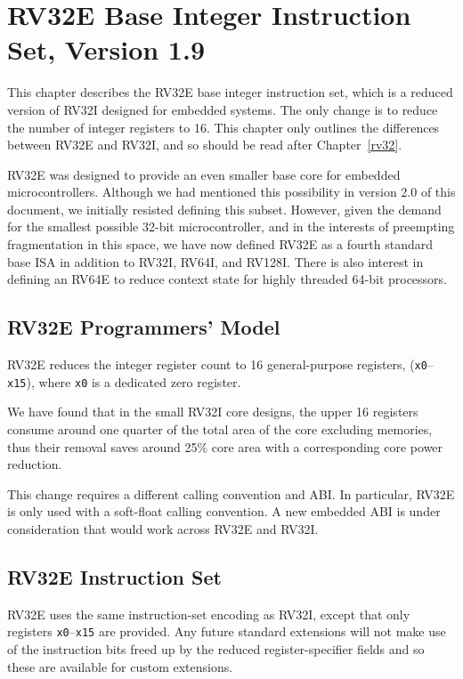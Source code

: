\chapter{RV32E Base Integer Instruction Set, Version 1.9}
\label{rv32e}

This chapter describes the RV32E base integer instruction set, which
is a reduced version of RV32I designed for embedded systems.  The only
change is to reduce the number of integer registers to 16.  This
chapter only outlines the differences between RV32E and RV32I, and so
should be read after Chapter~\ref{rv32}.

\begin{commentary}
RV32E was designed to provide an even smaller base core for embedded
microcontrollers.  Although we had mentioned this possibility in
version 2.0 of this document, we initially resisted defining this
subset. However, given the demand for the smallest possible 32-bit
microcontroller, and in the interests of preempting fragmentation in
this space, we have now defined RV32E as a fourth standard base ISA in
addition to RV32I, RV64I, and RV128I.  There is also interest in
defining an RV64E to reduce context state for highly threaded 64-bit
processors.
\end{commentary}

\section{RV32E Programmers' Model}

RV32E reduces the integer register count to 16 general-purpose
registers, ({\tt x0}--{\tt x15}), where {\tt x0} is a dedicated zero
register.

\begin{commentary}
We have found that in the small RV32I core designs, the upper 16
registers consume around one quarter of the total area of the core
excluding memories, thus their removal saves around 25\% core area
with a corresponding core power reduction.
\end{commentary}

\begin{commentary}
This change requires a different calling convention and ABI.  In
particular, RV32E is only used with a soft-float calling convention.
A new embedded ABI is under consideration that would work across RV32E
and RV32I.
\end{commentary}

\section{RV32E Instruction Set}

RV32E uses the same instruction-set encoding as RV32I, except that
only registers {\tt x0}--{\tt x15} are provided.  Any future standard
extensions will not make use of the instruction bits freed up by the
reduced register-specifier fields and so these are available for
custom extensions.

